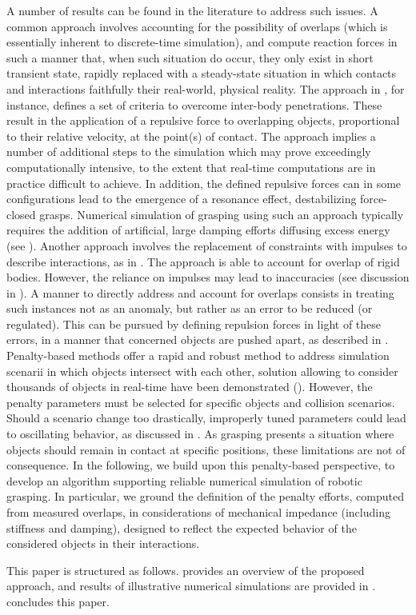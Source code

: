 A number of results can be found in  the literature to address such issues. A common approach involves accounting for the possibility of overlaps (which is essentially inherent to discrete-time simulation), and compute reaction forces in such a manner that, when such situation do occur, they only exist in short transient state, rapidly replaced with a steady-state situation in which contacts and interactions faithfully their real-world, physical reality. The approach in \cite{yamane2008}, for instance, defines a set of criteria to overcome inter-body penetrations. These result in the application of a repulsive force to overlapping objects, proportional to their relative velocity, at the point(s) of contact. The approach implies a number of additional steps to the simulation which may prove exceedingly computationally intensive, to the extent that real-time computations are in practice difficult to achieve. In addition, the defined repulsive forces can in some configurations lead to the emergence of a resonance effect, destabilizing force-closed grasps. Numerical simulation of grasping using such an approach typically requires the addition of artificial, large damping efforts diffusing excess energy (see \cite{engine_simulation}). Another approach involves the replacement of constraints with impulses to describe interactions, as in \cite{impulse_based}. The approach is able to account for overlap of rigid bodies. However, the reliance on impulses may lead to inaccuracies (see discussion in \cite{impulse_based}). A manner to directly address and account for overlaps consists in treating such instances not as an anomaly, but rather as an error to be reduced (or regulated). This can be pursued by defining repulsion forces in light of these errors, in a manner that concerned objects are pushed apart, as described in \cite{drumwright_penalty_based}. Penalty-based methods offer a rapid and robust method to address simulation scenarii in which objects intersect with each other, solution allowing to consider thousands of objects in real-time have been demonstrated (\cite{fast_penalty_based,drumwright_fast_penalty}). However, the penalty parameters must be selected for specific objects and collision scenarios. Should a scenario change too drastically, improperly tuned parameters could lead to oscillating behavior, as discussed in \cite{mirtich1998}. As grasping presents a situation where objects should remain in contact at specific positions, these limitations are not of consequence.
In the following, we build upon this penalty-based perspective, to develop an algorithm supporting reliable numerical simulation of robotic grasping. In particular, we ground the definition of the penalty efforts, computed from measured overlaps, in considerations of mechanical impedance (including stiffness and damping), designed to reflect the expected behavior of the considered objects in their interactions.

This paper is structured as follows.  provides an overview of the proposed approach, and results of illustrative numerical simulations are provided in .  concludes this paper. 